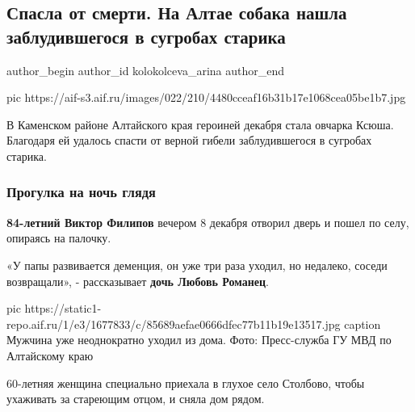  
 
 
 
 
 
\subsection{Спасла от смерти. На Алтае собака нашла заблудившегося в сугробах старика}
\label{sec:14_12_2020.news.ru.aif.kolokolceva_arina.1.spasla_ot_smerti}
\ifcmt
	author_begin
   author_id kolokolceva_arina
	author_end
\fi

\ifcmt
pic https://aif-s3.aif.ru/images/022/210/4480cceaf16b31b17e1068cea05be1b7.jpg
\fi


В Каменском районе Алтайского края героиней декабря стала овчарка Ксюша.
Благодаря ей удалось спасти от верной гибели заблудившегося в сугробах старика.

\subsubsection{Прогулка на ночь глядя}

\textbf{84-летний Виктор Филипов} вечером 8 декабря отворил дверь и пошел по селу,
опираясь на палочку.

«У папы развивается деменция, он уже три раза уходил, но недалеко, соседи
возвращали», - рассказывает \textbf{дочь Любовь Романец}.

\ifcmt
pic https://static1-repo.aif.ru/1/e3/1677833/c/85689aefae0666dfec77b11b19e13517.jpg
caption Мужчина уже неоднократно уходил из дома. Фото: Пресс-служба ГУ МВД по Алтайскому краю 
\fi

60-летняя женщина специально приехала в глухое село Столбово, чтобы ухаживать
за стареющим отцом, и сняла дом рядом.


